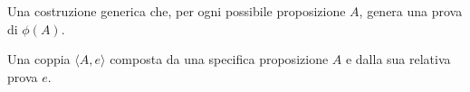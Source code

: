 \begin{description}[leftmargin=3.5em, style=nextline]
    \item[$\forall X \phi(X)$] Una costruzione generica che, per ogni possibile proposizione $A$, genera una prova di $\phi(A)$.
    \item[$\exists X \phi(X)$] Una coppia $\langle A, e \rangle$ composta da una specifica proposizione $A$ e dalla sua relativa prova $e$.
\end{description}
